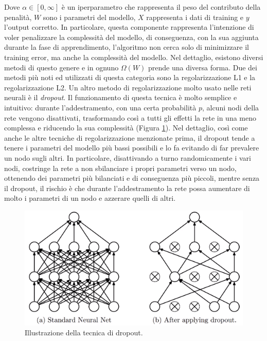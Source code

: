 Dove $\alpha\in[0, \infty] $ è un iperparametro che rappresenta il peso del contributo della penalità, $W$ sono i parametri del modello, $X$ rappresenta i dati di training e $y$ l'output corretto. In particolare, questa componente rappresenta l'intenzione di voler penalizzare la complessità del modello, di conseguenza, con la sua aggiunta durante la fase di apprendimento, l'algoritmo non cerca solo di minimizzare il training error, ma anche la complessità del modello. Nel dettaglio, esistono diversi metodi di questo genere e in ognuno $\Omega(W)$ prende una diversa forma. Due dei metodi più noti ed utilizzati di questa categoria sono la regolarizzazione L1 e la regolarizzazione L2. Un altro metodo di regolarizzazione molto usato nelle reti neurali è il \textit{dropout}. Il funzionamento di questa tecnica è molto semplice e intuitivo: durante l'addestramento, con una certa probabilità $p$, alcuni nodi della rete vengono disattivati, trasformando così a tutti gli effetti la rete in una meno complessa e riducendo la sua complessità (Figura \ref{fig:dropout}). Nel dettaglio, così come anche le altre tecniche di regolarizzazione menzionate prima, il dropout tende a tenere i parametri del modello  più bassi possibili e lo fa evitando di far prevalere un nodo sugli altri. In particolare, disattivando a turno randomicamente i vari nodi, costringe la rete a non sbilanciare i propri parametri verso un nodo, ottenendo dei parametri più bilanciati e di conseguenza più piccoli, mentre senza il dropout, il rischio è che durante l'addestramento la rete possa aumentare di molto i parametri di un nodo e azzerare quelli di altri.

\begin{figure}[h!]
  \hspace*{0.4in}
  \includegraphics[scale=0.6]{img/dropout.png}
  \caption{Illustrazione della tecnica di dropout.}
  \label{fig:dropout}
\end{figure}




